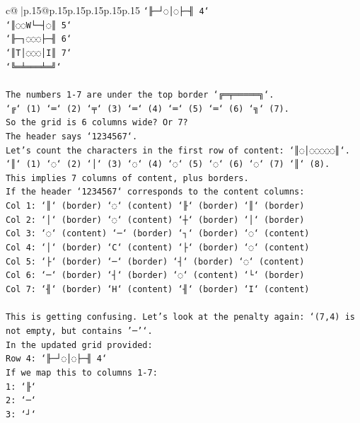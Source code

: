 \documentclass{article}
\begin{document}
{\begin{supertabular}{c@{$\;$}|p{.15\linewidth}@{}p{.15\linewidth}p{.15\linewidth}p{.15\linewidth}p{.15\linewidth}p{.15\linewidth}}
{{{\texttt{`╟─┘◌│◌├─╢ 4`} \\
\texttt{`║◌◌W└─┤◌║ 5`} \\
\texttt{`╟─┐◌◌◌├─╢ 6`} \\
\texttt{`║T│◌◌◌│I║ 7`} \\
\texttt{`╚═╧═══╧═╝`} \\
\\ 
\texttt{The numbers 1{-}7 are under the top border `╔═╤═════╗`.} \\
\texttt{`╔` (1) `═` (2) `╤` (3) `═` (4) `═` (5) `═` (6) `╗` (7).} \\
\texttt{So the grid is 6 columns wide? Or 7?} \\
\texttt{The header says `1234567`.} \\
\texttt{Let's count the characters in the first row of content: `║◌│◌◌◌◌◌║`.} \\
\texttt{`║` (1) `◌` (2) `│` (3) `◌` (4) `◌` (5) `◌` (6) `◌` (7) `║` (8).} \\
\texttt{This implies 7 columns of content, plus borders.} \\
\texttt{If the header `1234567` corresponds to the content columns:} \\
\texttt{Col 1: `║` (border) `◌` (content) `╟` (border) `║` (border)} \\
\texttt{Col 2: `│` (border) `◌` (content) `┼` (border) `│` (border)} \\
\texttt{Col 3: `◌` (content) `─` (border) `┐` (border) `◌` (content)} \\
\texttt{Col 4: `│` (border) `C` (content) `├` (border) `◌` (content)} \\
\texttt{Col 5: `├` (border) `─` (border) `┤` (border) `◌` (content)} \\
\texttt{Col 6: `─` (border) `┤` (border) `◌` (content) `└` (border)} \\
\texttt{Col 7: `╢` (border) `H` (content) `╢` (border) `I` (content)} \\
\\ 
\texttt{This is getting confusing. Let's look at the penalty again: `(7,4) is not empty, but contains '─'`.} \\
\texttt{In the updated grid provided:} \\
\texttt{Row 4: `╟─┘◌│◌├─╢ 4`} \\
\texttt{If we map this to columns 1{-}7:} \\
\texttt{1: `╟`} \\
\texttt{2: `─`} \\
\texttt{3: `┘`} \\
}}}
\end{supertabular}}
\end{document}
